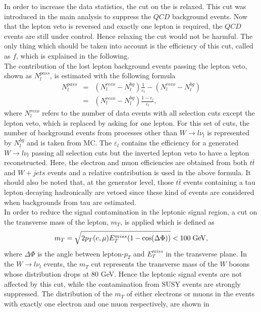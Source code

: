 In order to increase the data statistics, the cut on the 
\mindphifour is relaxed. This cut was introduced in the main analysis to suppress the $QCD$ background events. Now that 
the lepton veto is reversed and exactly one lepton is required, the $QCD$ events are still under control. 
Hence relaxing the \mindphifour cut would not be harmful. The only thing which should be taken into account 
is the efficiency of this cut, called as $f$, which is explained in the following.\\
The contribution of the lost lepton background events passing the lepton veto, shown as $N_l^{pass}$, is estimated with the following formula
\begin{eqnarray} 
N_l^{pass}&=&(N_l^{reco}-N_l^{bg})\frac{1}{\varepsilon_l}-(N_l^{reco}-N_l^{bg})\\\nonumber
&=&(N_l^{reco}-N_l^{bg})\frac{1-\varepsilon_l}{\varepsilon_l},\nonumber
\end{eqnarray}
where $N_l^{reco}$ refers to the number of data events with all selection cuts except the 
lepton veto, which is replaced by asking for one lepton. For this set of cuts, the number of background events from processes 
other than $W\rightarrow l\nu_l$ is represented by $N_l^{bg}$ and is taken from MC. The $\varepsilon_l$ contains 
the efficiency for a generated $W\rightarrow l\nu_l$ passing all selection cuts but the inverted lepton veto to have a 
lepton reconstructed. Here, the electron and muon efficiencies are obtained from both $t\bar t$ and $W+jets$ events and a relative contribution is used in the above formula. It should also be noted that, at the generator level, those $t\bar t$ events containing a tau lepton decaying hadronically are vetoed since these kind of events are considered when backgrounds from tau are estimated.\\ 
In order to reduce the signal contamination in the leptonic signal region, a cut on the transverse mass of the 
lepton, $m_T$, is applied which is defined as
$$m_T=\sqrt{2p_T(e,\mu)E_T^{miss}(1-\cos(\Delta\Phi))} < 100\; \rm GeV,$$
where $\Delta\Phi$ is the angle between lepton-$p_T$ and $E_T^{miss}$ in the transverse plane. 
In the $W\rightarrow l\nu_l$ events, the $m_T$ cut represents the transverse mass of 
the $W$ bosons whose distribution drops at $80$ GeV. Hence the leptonic signal events are not 
affected by this cut, while the contamination from SUSY events are strongly suppressed. The 
distribution of the $m_T$ of either electrons or muons in the events with exactly one electron and one muon respectively, are shown in
